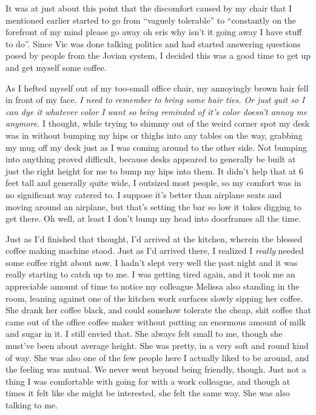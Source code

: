 \documentclass[a5paper]{report}%
\begin{document}
It was at just about this point that the discomfort caused by my chair that I
mentioned earlier started to go from ``vaguely tolerable'' to ``constantly on
the forefront of my mind please go away oh eris why isn't it going away I have
stuff to do''. Since Vic was done talking politics and had started answering
questions posed by people from the Jovian system, I decided this was a good time
to get up and get myself some coffee.

As I hefted myself out of my too-small office chair, my annoyingly brown hair
fell in front of my face. \textit{I need to remember to bring some hair ties. Or
just quit so I can dye it whatever color I want so being reminded of it's color
doesn't annoy me anymore.} I thought, while trying to shimmy out of the weird
corner spot my desk was in without bumping my hips or thighs into any tables on
the way, grabbing my mug off my desk just as I was coming around to the other
side. Not bumping into anything proved difficult, because desks appeared to
generally be built at just the right height for me to bump my hips into them. It
didn't help that at 6 feet tall and generally quite wide, I outsized most
people, so my comfort was in no significant way catered to. I suppose it's
better than airplane seats and moving around an airplane, but that's setting the
bar so low it takes digging to get there. Oh well, at least I don't bump my head
into doorframes all the time.

Just as I'd finished that thought, I'd arrived at the kitchen, wherein the
blessed coffee making machine stood. Just as I'd arrived there, I realized I
\textit{really} needed some coffee right about now. I hadn't slept very well the
past night and it was really starting to catch up to me. I was getting tired
again, and it took me an appreciable amount of time to notice my colleague
Melissa also standing in the room, leaning against one of the kitchen work
surfaces slowly sipping her coffee. She drank her coffee black, and could
somehow tolerate the cheap, shit coffee that came out of the office coffee maker
without putting an enormous amount of milk and sugar in it. I still envied that.
She always felt small to me, though she must've been about average height. She
was pretty, in a very soft and round kind of way. She was also one of the few
people here I actually liked to be around, and the feeling was mutual. We never
went beyond being friendly, though. Just not a thing I was comfortable with
going for with a work colleague, and though at times it felt like she might be
interested, she felt the same way. She was also talking to me.
\end{document}
